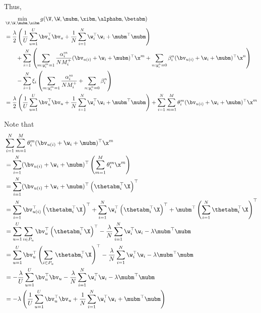 Thus, 
\begin{equation*}
\begin{aligned}
&\min_{\V, \W, \mubm, \xibm} g(\V, \W, \mubm, \xibm, \alphabm, \betabm) \\
&= \frac{\lambda}{2} \left( \frac{1}{U} \sum_{u=1}^U \bv_u^\top \bv_u 
     + \frac{1}{N} \sum_{i=1}^N \w_i^\top \w_i + \mubm^\top \mubm \right) \\
& \hspace{2em}
     + \sum_{i=1}^N \left( 
       \sum_{m: y_i^m = 1} \frac{\alpha_i^m}{N M_i^+} (\bv_{u(i)} + \w_i + \mubm)^\top \x^m 
     + \sum_{n: y_i^n = 0} \beta_i^n (\bv_{u(i)} + \w_i + \mubm)^\top \x^n \right) \\
& \hspace{2em}
     - \sum_{i=1}^N \xi_i \left( \sum_{m: y_i^m = 1} \frac{\alpha_i^m}{N M_i^+} + \sum_{n: y_i^n = 0} \beta_i^n \right) \\
&= \frac{\lambda}{2} \left( \frac{1}{U} \sum_{u=1}^U \bv_u^\top \bv_u 
     + \frac{1}{N} \sum_{i=1}^N \w_i^\top \w_i + \mubm^\top \mubm \right)
     + \sum_{i=1}^N \sum_{m=1}^M \theta_i^m (\bv_{u(i)} + \w_i + \mubm)^\top \x^m
\end{aligned}
\end{equation*}

Note that
\begin{equation*}
\begin{aligned}
&\sum_{i=1}^N \sum_{m=1}^M \theta_i^m (\bv_{u(i)} + \w_i + \mubm)^\top \x^m \\
&= \sum_{i=1}^N (\bv_{u(i)} + \w_i + \mubm)^\top \left( \sum_{m=1}^M \theta_i^m \x^m \right) \\
&= \sum_{i=1}^N (\bv_{u(i)} + \w_i + \mubm)^\top \left( \thetabm_i^\top \X \right)^\top \\
&= \sum_{i=1}^N \bv_{u(i)}^\top \left( \thetabm_i^\top \X \right)^\top 
     + \sum_{i=1}^N \w_i^\top \left( \thetabm_i^\top \X \right)^\top 
     + \mubm^\top \left( \sum_{i=1}^N \thetabm_i^\top \X \right)^\top \\
&= \sum_{u=1}^U \sum_{i \in P_u} \bv_u^\top \left( \thetabm_i^\top \X \right)^\top
     - \frac{\lambda}{N} \sum_{i=1}^N \w_i^\top \w_i 
     - \lambda \mubm^\top \mubm \\
&= \sum_{u=1}^U \bv_u^\top \left( \sum_{i \in P_u} \thetabm_i^\top \X \right)^\top
     - \frac{\lambda}{N} \sum_{i=1}^N \w_i^\top \w_i 
     - \lambda \mubm^\top \mubm \\
&= -\frac{\lambda}{U} \sum_{u=1}^U \bv_u^\top \bv_u
     - \frac{\lambda}{N} \sum_{i=1}^N \w_i^\top \w_i 
     - \lambda \mubm^\top \mubm \\
&= -\lambda \left( \frac{1}{U} \sum_{u=1}^U \bv_u^\top \bv_u
     + \frac{1}{N} \sum_{i=1}^N \w_i^\top \w_i 
     + \mubm^\top \mubm \right)
\end{aligned}
\end{equation*}

